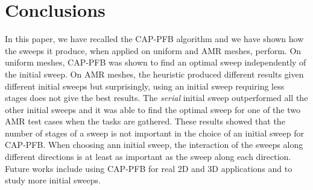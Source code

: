 \documentclass[letterpaper]{article}
\renewcommand{\(}{\left(}
\renewcommand{\)}{\right)}
\renewcommand{\[}{\left[}
\renewcommand{\]}{\right]}
\begin{document}
\section{Conclusions} \label{conclusions}
In this paper, we have recalled the CAP-PFB algorithm and we have shown how the
sweeps it produce, when applied on uniform and AMR meshes, perform. On uniform
meshes, CAP-PFB was shown to find an optimal sweep independently of the initial
sweep. On AMR meshes, the heuristic produced different results given different
initial sweeps but surprisingly, using an initial sweep requiring less stages
does not give the best results. The \emph{serial} initial sweep outperformed all
the other initial sweeps and it was able to find the optimal sweep for one of
the two AMR test cases when the tasks are gathered. These results showed that
the number of stages of a sweep is not important in the choice of an initial
sweep for CAP-PFB. When choosing ann initial sweep, the interaction of the
sweeps along different directions is at least as important as the sweep along each
direction. Future works include using CAP-PFB for real 2D and 3D applications
and to study more initial sweeps.




\end{document}
